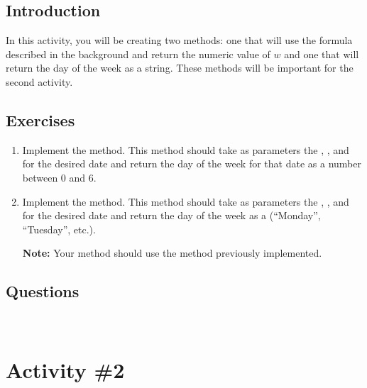 		\subsection{Introduction}
			In this activity, you will be creating two methods: one that will use the formula described in the background and return the numeric value of $w$ and one that will return the day of the week as a string. These methods will be important for the second activity.

		\subsection{Exercises}
			\begin{enumerate}
				\item Implement the  method. This method should take as parameters the , , and  for the desired date and return the day of the week for that date as a number between 0 and 6.
				\item Implement the  method. This method should take as parameters the , , and  for the desired date and return the day of the week as a  (``Monday'', ``Tuesday'', etc.).

							{\small\textbf{Note:} Your  method should use the  method previously implemented.}
			\end{enumerate}

		\subsection{Questions}
			\ \\[9pt]

	\pagebreak

	\section{Activity \#2}
